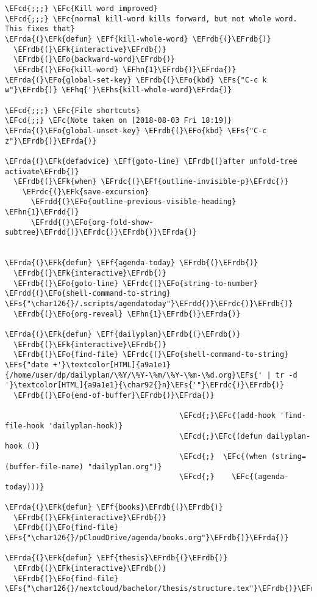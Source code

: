 \documentclass[a4wide,10pt]{article}
\newcommand{\EFc}[1]{\textcolor{EFc}{#1}} %
\newcommand{\EFcd}[1]{\textcolor{EFcd}{#1}} %
\newcommand{\EFs}[1]{\textcolor{EFs}{#1}} %
\newcommand{\EFk}[1]{\textcolor{EFk}{#1}} %
\newcommand{\EFf}[1]{\textcolor{EFf}{#1}} %
\newcommand{\EFo}[1]{\textcolor{EFo}{#1}} %
\newcommand{\EFhn}[1]{\textcolor{EFhn}{\textbf{#1}}} %
\newcommand{\EFhq}[1]{\textcolor{EFhq}{#1}} %
\newcommand{\EFhs}[1]{\textcolor{EFhs}{#1}} %
\newcommand{\EFrda}[1]{\textcolor{EFrda}{#1}} %
\newcommand{\EFrdb}[1]{\textcolor{EFrdb}{#1}} %
\newcommand{\EFrdc}[1]{\textcolor{EFrdc}{#1}} %
\newcommand{\EFrdd}[1]{\textcolor{EFrdd}{#1}} %
\begin{document}
\begin{Code}
\begin{Verbatim}
\EFcd{;;;} \EFc{Kill word improved}
\EFcd{;;;} \EFc{normal kill-word kills forward, but not whole word. This fixes that}
\EFrda{(}\EFk{defun} \EFf{kill-whole-word} \EFrdb{(}\EFrdb{)}
  \EFrdb{(}\EFk{interactive}\EFrdb{)}
  \EFrdb{(}\EFo{backward-word}\EFrdb{)}
  \EFrdb{(}\EFo{kill-word} \EFhn{1}\EFrdb{)}\EFrda{)}
\EFrda{(}\EFo{global-set-key} \EFrdb{(}\EFo{kbd} \EFs{"C-c k w"}\EFrdb{)} \EFhq{'}\EFhs{kill-whole-word}\EFrda{)}

\EFcd{;;;} \EFc{File shortcuts}
\EFcd{;;} \EFc{Note taken on [2018-08-03 Fri 18:19]}
\EFrda{(}\EFo{global-unset-key} \EFrdb{(}\EFo{kbd} \EFs{"C-c z"}\EFrdb{)}\EFrda{)}

\EFrda{(}\EFk{defadvice} \EFf{goto-line} \EFrdb{(}after unfold-tree activate\EFrdb{)}
  \EFrdb{(}\EFk{when} \EFrdc{(}\EFf{outline-invisible-p}\EFrdc{)}
    \EFrdc{(}\EFk{save-excursion}
      \EFrdd{(}\EFo{outline-previous-visible-heading} \EFhn{1}\EFrdd{)}
      \EFrdd{(}\EFo{org-fold-show-subtree}\EFrdd{)}\EFrdc{)}\EFrdb{)}\EFrda{)}


\EFrda{(}\EFk{defun} \EFf{agenda-today} \EFrdb{(}\EFrdb{)}
  \EFrdb{(}\EFk{interactive}\EFrdb{)}
  \EFrdb{(}\EFo{goto-line} \EFrdc{(}\EFo{string-to-number} \EFrdd{(}\EFo{shell-command-to-string} \EFs{"\char126{}/.scripts/agendatoday"}\EFrdd{)}\EFrdc{)}\EFrdb{)}
  \EFrdb{(}\EFo{org-reveal} \EFhn{1}\EFrdb{)}\EFrda{)}

\EFrda{(}\EFk{defun} \EFf{dailyplan}\EFrdb{(}\EFrdb{)}
  \EFrdb{(}\EFk{interactive}\EFrdb{)}
  \EFrdb{(}\EFo{find-file} \EFrdc{(}\EFo{shell-command-to-string} \EFs{"date +'}\textcolor[HTML]{a9a1e1}{/home/user/dp/dailyplan/\%Y/\%Y-\%m/\%Y-\%m-\%d.org}\EFs{' | tr -d '}\textcolor[HTML]{a9a1e1}{\char92{}n}\EFs{'"}\EFrdc{)}\EFrdb{)}
  \EFrdb{(}\EFo{end-of-buffer}\EFrdb{)}\EFrda{)}

                                        \EFcd{;}\EFc{(add-hook 'find-file-hook 'dailyplan-hook)}
                                        \EFcd{;}\EFc{(defun dailyplan-hook ()}
                                        \EFcd{;}  \EFc{(when (string= (buffer-file-name) "dailyplan.org")}
                                        \EFcd{;}    \EFc{(agenda-today)))}

\EFrda{(}\EFk{defun} \EFf{books}\EFrdb{(}\EFrdb{)}
  \EFrdb{(}\EFk{interactive}\EFrdb{)}
  \EFrdb{(}\EFo{find-file} \EFs{"\char126{}/pCloudDrive/agenda/books.org"}\EFrdb{)}\EFrda{)}

\EFrda{(}\EFk{defun} \EFf{thesis}\EFrdb{(}\EFrdb{)}
  \EFrdb{(}\EFk{interactive}\EFrdb{)}
  \EFrdb{(}\EFo{find-file} \EFs{"\char126{}/nextcloud/bachelor/thesis/structure.tex"}\EFrdb{)}\EFrda{)}


\end{Verbatim}
\end{Code}
\end{document}

